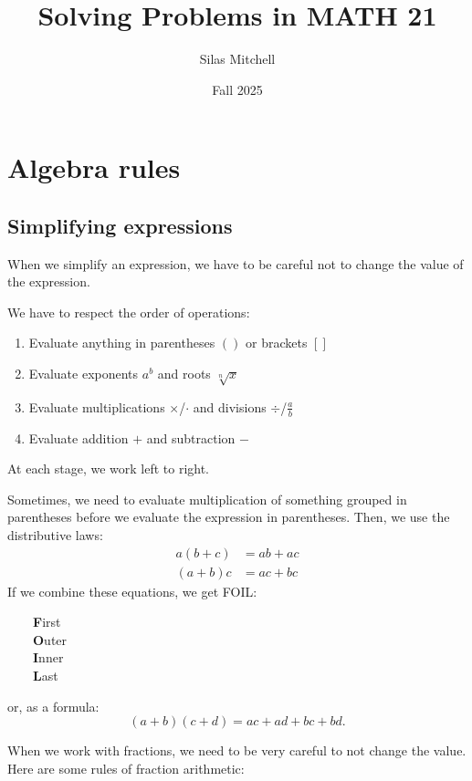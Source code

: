 \documentclass{article}
\title{Solving Problems in MATH 21}
\author{Silas Mitchell}
\date{Fall 2025}
\begin{document}
\maketitle

\section*{Algebra rules}

\subsection*{Simplifying expressions}

When we simplify an expression, we have to be careful not to change the value of the expression.

We have to respect the order of operations:
\begin{enumerate}
    \item Evaluate anything in parentheses $()$ or brackets $[]$
    \item Evaluate exponents $a^b$ and roots $\sqrt[n]{x}$
    \item Evaluate multiplications $\times$/$\cdot$ and divisions $\div$/$\frac{a}{b}$
    \item Evaluate addition $+$ and subtraction $-$
\end{enumerate}
At each stage, we work left to right.

Sometimes, we need to evaluate multiplication of something grouped in parentheses before we evaluate the expression in parentheses. Then, we use the distributive laws:
\begin{align*}
    a(b+c)&=ab+ac\\
    (a+b)c&=ac+bc
\end{align*}
If we combine these equations, we get FOIL:

$\qquad${\bf F}irst\\$\qquad${\bf O}uter\\$\qquad${\bf I}nner\\$\qquad${\bf L}ast 

or, as a formula: \[(a+b)(c+d)=ac+ad+bc+bd.\]

When we work with fractions, we need to be very careful to not change the value. Here are some rules of fraction arithmetic:
\end{document}
